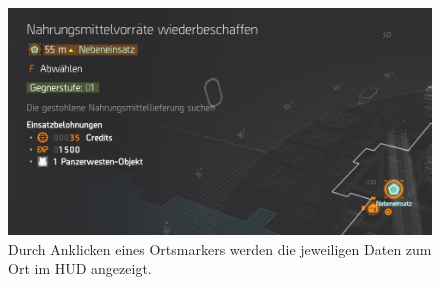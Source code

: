 \begin{figure}[p]
    \centering
    \includegraphics[width=\linewidth]{figures/concept/the_division_attributes_x}
    \caption{Durch Anklicken eines Ortsmarkers werden die jeweiligen Daten zum Ort im HUD angezeigt.}
    \label{fig:tctd_attributes}
\end{figure}
